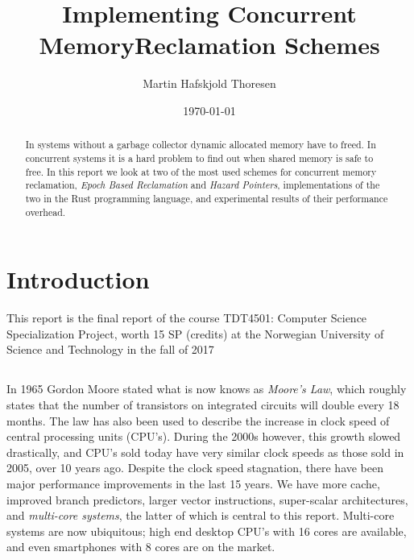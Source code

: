\documentclass[b5paper]{report}
\begin{document}
\title{Implementing Concurrent Memory\linebreak Reclamation Schemes}
\author{Martin Hafskjold Thoresen}
\date{\today}
\maketitle



\begin{abstract}
  In systems without a garbage collector dynamic allocated memory have to freed.
  In concurrent systems it is a hard problem to find out when shared memory is
  safe to free. In this report we look at two of the most used schemes for
  concurrent memory reclamation, \emph{Epoch Based Reclamation} and \emph{Hazard
  Pointers}, implementations of the two in the Rust programming language, and
  experimental results of their performance overhead.
\end{abstract}

\tableofcontents

\chapter{Introduction}

This report is the final report of the course TDT4501: Computer Science
Specialization Project, worth 15 SP (credits) at the Norwegian University of
Science and Technology in the fall of 2017

\section*{}

In 1965 Gordon Moore stated what is now knows as \emph{Moore's Law}, which
roughly states that the number of transistors on integrated circuits will double
every 18 months. The law has also been used to describe the increase in clock
speed of central processing units (CPU's). During the 2000s however, this growth
slowed drastically, and CPU's sold today have very similar clock speeds as those
sold in 2005, over 10 years ago. Despite the clock speed stagnation, there have
been major performance improvements in the last 15 years. We have more cache,
improved branch predictors, larger vector instructions, super-scalar
architectures, and \emph{multi-core systems}, the latter of which is central to
this report. Multi-core systems are now ubiquitous; high end desktop CPU's with
16 cores are available, and even smartphones with 8 cores are on the market.
\end{document}
